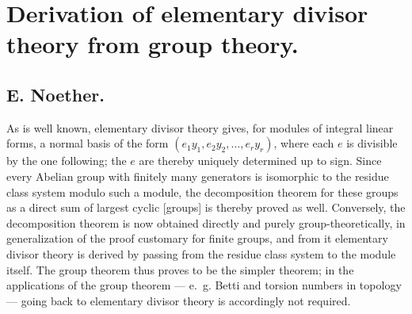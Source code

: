 \documentclass{article}
\begin{document}

\section*{Derivation of elementary divisor theory from group theory.}

\subsection*{E. Noether.}

As is well known, elementary divisor theory gives, for modules of integral linear forms, a normal basis of the form $(e_1 y_1, e_2 y_2, \ldots, e_r y_r)$, where each $e$ is divisible by the one following; the $e$ are thereby uniquely determined up to sign. Since every Abelian group with finitely many generators is isomorphic to the residue class system modulo such a module, the decomposition theorem for these groups as a direct sum of largest cyclic [groups] is thereby proved as well. Conversely, the decomposition theorem is now obtained directly and purely group-theoretically, in generalization of the proof customary for finite groups, and from it elementary divisor theory is derived by passing from the residue class system to the module itself. The group theorem thus proves to be the simpler theorem; in the applications of the group theorem --- e.\ g. Betti and torsion numbers in topology --- going back to elementary divisor theory is accordingly not required.
\end{document}
